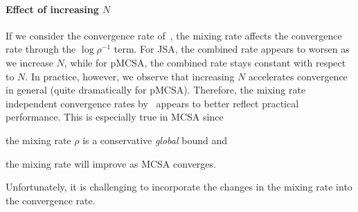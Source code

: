 \vspace{-0.1in}
\paragraph{Effect of increasing \(N\)}
If we consider the convergence rate of~\citet{duchi_ergodic_2012}, the mixing rate affects the convergence rate through the \(\log \rho^{-1}\) term.
For JSA, the combined rate appears to worsen as we increase \(N\), while for pMCSA, the combined rate stays constant with respect to \(N\).
In practice, however, we observe that increasing \(N\) accelerates convergence in general (quite dramatically for pMCSA).
Therefore, the mixing rate independent convergence rates by~\citet{doan_finitetime_2020, doan_convergence_2020} appears to better reflect practical performance.
This is especially true in MCSA since
\begin{enumerate*}[label=\textbf{(\roman*)}]
  \item the mixing rate \(\rho\) is a conservative \textit{global} bound and 
  \item the mixing rate will improve as MCSA converges.
\end{enumerate*}
Unfortunately, it is challenging to incorporate the changes in the mixing rate into the convergence rate.


